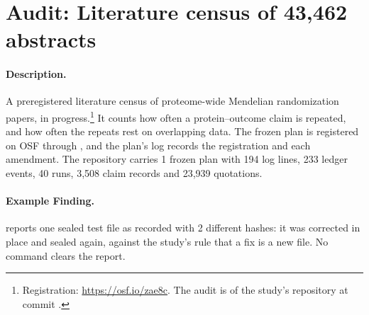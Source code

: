 
\section{Audit: Literature census of 43{,}462 abstracts}
\label{sec:census}

\paragraph{Description.} A preregistered literature census of proteome-wide Mendelian randomization
papers, in progress.\footnote{Registration: \url{https://osf.io/zae8c}. The audit is of the study's repository at commit .}
It counts how often a protein--outcome claim is repeated, and how often the repeats rest on
overlapping data. The frozen plan is registered on OSF through , and the
plan's log records the registration and each amendment.
The repository carries 1 frozen plan with 194 log lines, 233
ledger events, 40 runs, 3{,}508 claim records and 23{,}939 quotations.

\paragraph{Example Finding.}  reports one sealed test file as recorded
with 2 different hashes: it was corrected in place and sealed again, against the study's rule that
a fix is a new file. No command clears the report.

